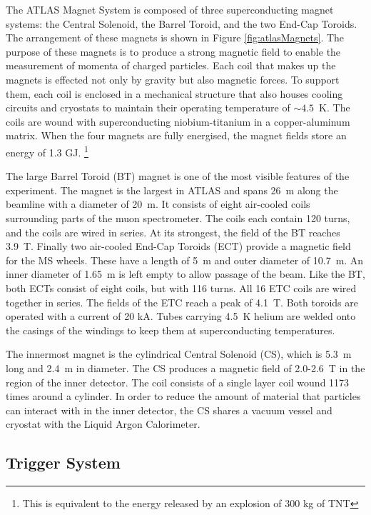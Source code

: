 The ATLAS Magnet System is composed of three superconducting magnet systems: the Central Solenoid, the Barrel Toroid, and the two End-Cap Toroids.
The arrangement of these magnets is shown in Figure \ref{fig:atlasMagnets}.
The purpose of these magnets is to produce a strong magnetic field to enable the measurement of momenta of charged particles.
Each coil that makes up the magnets is effected not only by gravity but also magnetic forces.
To support them, each coil is enclosed in a mechanical structure that also houses cooling circuits and cryostats to maintain their operating temperature of $\sim4.5$~K.
The coils are wound with superconducting niobium-titanium in a copper-aluminum matrix.
When the four magnets are fully energised, the magnet fields store an energy of 1.3 GJ. \footnote{This is equivalent to the energy released by an explosion of 300 kg of TNT}

The large Barrel Toroid (BT) magnet is one of the most visible features of the experiment.
The magnet is the largest in ATLAS and spans 26~m along the beamline with a diameter of 20~m. 
It consists of eight air-cooled coils surrounding parts of the muon spectrometer.
The coils each contain 120 turns, and the coils are wired in series.
At its strongest, the field of the BT reaches 3.9~T.
Finally two air-cooled End-Cap Toroids (ECT) provide a magnetic field for the MS wheels.
These have a length of 5~m and outer diameter of 10.7~m. An inner diameter of 1.65~m is left empty to allow passage of the beam.
Like the BT, both ECTs consist of eight coils, but with 116 turns.
All 16 ETC coils are wired together in series.
The fields of the ETC reach a peak of 4.1~T.
Both toroids are operated with a current of 20 kA.
Tubes carrying 4.5~K helium are welded onto the casings of the windings to keep them at superconducting temperatures.

The innermost magnet is the cylindrical Central Solenoid (CS), which is 5.3~m long and 2.4~m in diameter.
The CS produces a magnetic field of 2.0-2.6~T in the region of the inner detector.
The coil consists of a single layer coil wound 1173 times around a cylinder.
In order to reduce the amount of material that particles can interact with in the inner detector, the CS shares a vacuum vessel and cryostat with the Liquid Argon Calorimeter.
\cite{atlasFacts}
\cite{magnetTdr}

\subsection{Trigger System}

